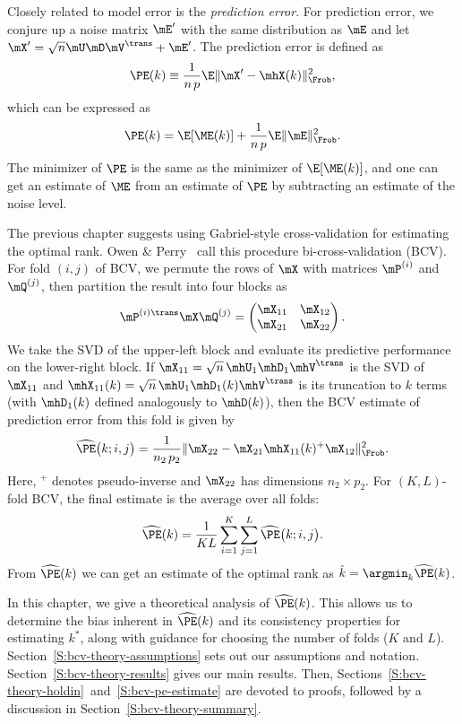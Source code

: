 Closely related to model error is the \emph{prediction error}.  For prediction error, we conjure up a noise matrix $\mE'$ with the same distribution as $\mE$ and let $\mX' = \sqrt{n} \mU \mD \mV^\trans + \mE'$.  The prediction error is defined as
\[
    \PE(k) \equiv \frac{1}{n \, p} \E\| \mX' - \mhX(k) \|_\Frob^2,
\]
which can be expressed as
\[
    \PE(k) = \E[ \ME(k) ] + \frac{1}{n \, p} \E \| \mE \|_\Frob^2.
\]
The minimizer of $\PE$ is the same as the minimizer of $\E[ \ME(k) ]$,
and one can get an estimate of $\ME$ from an estimate of $\PE$ by subtracting an estimate of the noise level.

The previous chapter suggests using Gabriel-style cross-validation for estimating the optimal rank.  Owen \& Perry~\cite{owen2009bi} call this procedure bi-cross-validation (BCV).  For fold $(i,j)$ of BCV, we permute
the rows of $\mX$ with matrices $\mP^{(i)}$ and $\mQ^{(j)}$, then partition the result into four blocks as
\[
    \mP^{(i)\trans} \mX \mQ^{(j)}
        =
        \left(
        \begin{matrix}
            \mX_{11} & \mX_{12} \\
            \mX_{21} & \mX_{22}
        \end{matrix}
        \right).
\]
We take the SVD of the upper-left block and evaluate its predictive 
performance on the lower-right block.  If 
$\mX_{11} = \sqrt{n} \, \mhU_1 \mhD_1 \mhV^\trans$ is the SVD of $\mX_{11}$ and
$\mhX_{11}(k) = \sqrt{n} \, \mhU_1 \mhD_1(k) \mhV^\trans$ is its truncation to 
$k$ terms (with $\mhD_1(k)$ defined analogously to $\mhD(k)$), then the BCV estimate of prediction error from this fold is given 
by
\[
    \widehat{\PE}\big(k ; i, j \big)
        =
            \frac{1}{n_2 \, p_2}
            \| \mX_{22} - \mX_{21} \mhX_{11}(k)^+ \mX_{12} \|_\Frob^2.
\]
Here, $^+$ denotes pseudo-inverse and $\mX_{22}$ has dimensions $n_2 \times p_2$.  For $(K,L)$-fold BCV, the final estimate is the average over all folds:
\[
    \widehat{\PE}(k)
        =
        \frac{1}{K L}
        \sum_{i=1}^K
        \sum_{j=1}^L
            \widehat{\PE}\big(k ; i, j \big).
\]
From $\widehat{\PE}(k)$ we can get an estimate of the optimal rank as
$\hat k = \argmin_k \widehat{\PE}(k)$.

In this chapter, we give a theoretical analysis of $\widehat{\PE}(k)$. This
allows us to determine the bias inherent in $\widehat{\PE}(k)$ and its
consistency properties for estimating $k^\ast$, along with guidance for
choosing the number of folds ($K$ and $L$).
Section~\ref{S:bcv-theory-assumptions} sets out our assumptions and notation.
Section~\ref{S:bcv-theory-results} gives our main results.  Then, Sections~\ref{S:bcv-theory-holdin}~and~\ref{S:bcv-pe-estimate} are devoted to proofs, followed by a discussion in Section~\ref{S:bcv-theory-summary}.


